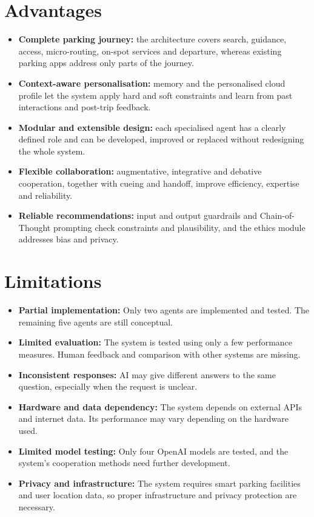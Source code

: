 \documentclass[12pt,a4paper]{report}
\begin{document}
\section{Advantages}
\begin{itemize}[leftmargin=*]
  \item \textbf{Complete parking journey:} the architecture covers search, guidance, access, micro-routing, on-spot services and departure, whereas existing parking apps address only parts of the journey.
  \item \textbf{Context-aware personalisation:} memory and the personalised cloud profile let the system apply hard and soft constraints and learn from past interactions and post-trip feedback.
  \item \textbf{Modular and extensible design:} each specialised agent has a clearly defined role and can be developed, improved or replaced without redesigning the whole system.
  \item \textbf{Flexible collaboration:} augmentative, integrative and debative cooperation, together with cueing and handoff, improve efficiency, expertise and reliability.
  \item \textbf{Reliable recommendations:} input and output guardrails and Chain-of-Thought prompting check constraints and plausibility, and the ethics module addresses bias and privacy.
\end{itemize}
\section{Limitations}
\begin{itemize}[leftmargin=*]
  \item \textbf{Partial implementation:} Only two agents are implemented and tested. The remaining five agents are still conceptual.
  \item \textbf{Limited evaluation:} The system is tested using only a few performance measures. Human feedback and comparison with other systems are missing.
  \item \textbf{Inconsistent responses:} AI may give different answers to the same question, especially when the request is unclear.
  \item \textbf{Hardware and data dependency:} The system depends on external APIs and internet data. Its performance may vary depending on the hardware used.
  \item \textbf{Limited model testing:} Only four OpenAI models are tested, and the system's cooperation methods need further development.
  \item \textbf{Privacy and infrastructure:} The system requires smart parking facilities and user location data, so proper infrastructure and privacy protection are necessary.
\end{itemize}
\end{document}
